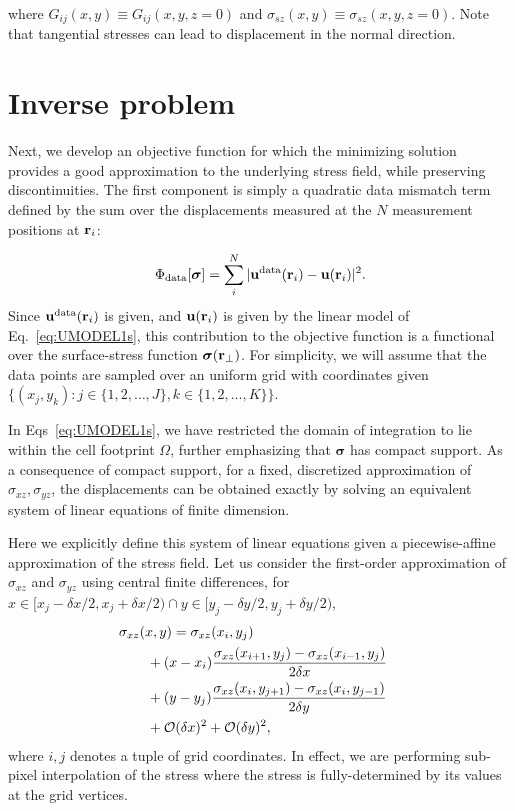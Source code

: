 \documentclass[aps,prl,reprint,twocolumn,groupedaddress,showpacs]{revtex4}
\def\r{{\bf r}}
\def\u{{\bf u}}
\newcommand{\bs}{\boldsymbol{\sigma}}
\begin{document}
where $G_{ij}(x,y) \equiv G_{ij}(x,y,z=0)$ and $\sigma_{sz}(x,y)
\equiv \sigma_{sz}(x,y,z=0)$.  Note that tangential stresses can lead
to displacement in the normal direction.


\section{Inverse problem}

Next, we develop an objective function for which the minimizing
solution provides a good approximation to the underlying stress field,
while preserving discontinuities.  The first component is simply a
quadratic data mismatch term defined by the sum over the displacements
measured at the $N$ measurement positions at $\r_{i}$:

\begin{equation}
\Phi_{\rm data}[\bs] = \sum_{i}^{N}\vert \u^{\rm
  data}(\r_{i})- \u(\r_i)\vert^{2}.
\end{equation}
%
Since $\u^{\rm data}(\r_{i})$ is given, and $\u(\r_{i})$ is given by the linear model 
of Eq.~\ref{eq:UMODEL1s}, this contribution to the objective function is
a functional over the surface-stress function $\bs(\r_{\perp})$.  For
simplicity, we will assume that the data points are sampled over an
uniform grid with coordinates given $\{ (x_j,y_k) :
j\in\{1,2,\ldots,J\}, k\in\{1,2,\ldots,K\}\}.$

In Eqs~\ref{eq:UMODEL1s}, we have restricted the domain of integration
to lie within the cell footprint $\Omega$, further emphasizing that
$\boldsymbol\sigma$ has compact support. As a consequence of compact
support, for a fixed, discretized approximation of
$\sigma_{xz},\sigma_{yz}$, the displacements can be obtained exactly
by solving an equivalent system of linear equations of finite
dimension.

Here we explicitly define this system of linear equations given a
piecewise-affine approximation of the stress field. Let us consider
the first-order approximation of $\sigma_{xz}$ and $\sigma_{yz}$ using
central finite differences, for $x\in[x_j - \delta x/2, x_j+\delta
  x/2) \cap y\in[y_j-\delta y/2, y_j + \delta y /2)$,
\begin{align}
\lefteqn{\sigma_{xz}(x,y) =\sigma_{xz}(x_i , y_j)  }\nonumber \\
& \qquad+ (x-x_i)\frac{\sigma_{xz}(x_{i+1},y_j) -\sigma_{xz}(x_{i-1},y_j) }{2\delta x}  \nonumber\\
&\qquad + (y-y_j)\frac{\sigma_{xz}(x_i,y_{j+1}) - \sigma_{xz}(x_i,y_{j-1}) }{2\delta y} \nonumber\\
&\qquad + \mathcal{O}(\delta x)^2 + \mathcal{O}(\delta y)^2,\label{eq:sigma_affine}
\end{align}
where $i,j$ denotes a tuple of grid coordinates. In effect, we are
performing sub-pixel interpolation of the stress where the stress is
fully-determined by its values at the grid vertices.
\end{document}

